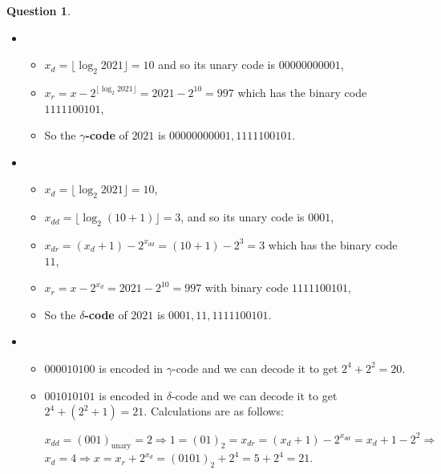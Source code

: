 \documentclass[11pt,a4paper,reqno]{amsart}
\theoremstyle{definition}
\theoremstyle{notation}
\newtheorem{question}[theorem]{Question}
\begin{document}
\begin{question}%
\end{question}
\begin{itemize}
\item 
\begin{itemize}
\item $x_d = \lfloor \log_2 2021 \rfloor = 10$ and so its unary code is $00000000001$,
\item $x_r = x - 2^{\lfloor \log_2 2021 \rfloor } = 2021 - 2^{10} = 997$ which has the binary code $1111100101$,
\item So the {\bf $\gamma$-code} of $2021$ is $00000000001,1111100101$. 
\end{itemize}
\item 
\begin{itemize}
\item $x_d = \lfloor \log_2 2021 \rfloor = 10$, 
\item $x_{dd} = \lfloor \log_2(10+1) \rfloor = 3$, and so its unary code is $0001$,
\item $x_{dr} = (x_d+1) - 2^{x_{dd}} = (10+1) - 2^3 = 3$ which has the binary code $11$, 
\item $x_r = x - 2^{x_d} = 2021 - 2^{10} = 997$ with binary code $1111100101$,
\item So the {\bf $\delta$-code} of $2021$ is $0001,11,1111100101$. 
\end{itemize}
\item
\begin{itemize}
\item $000010100$ is encoded in $\gamma$-code and we can decode it to get $2^4+2^2=20$.
\item $001010101$ is encoded in $\delta$-code and we can decode it to get $2^4+(2^2+1)=21$. Calculations are as follows:

$x_{dd} = (001)_{\text{unary}} = 2 \Rightarrow 1 = (01)_2 = x_{dr} = (x_d+1) - 2^{x_{dd}} = x_d + 1 - 2^2 \Rightarrow$ $x_d = 4 \Rightarrow x = x_r + 2^{x_d} = (0101)_2 + 2^4 = 5 + 2^4 = 21$. 
\end{itemize}
\end{itemize}
\end{document}
